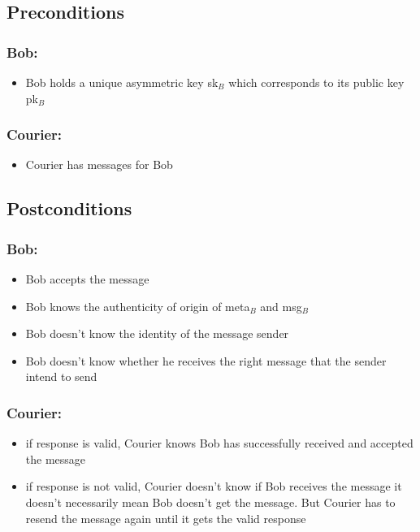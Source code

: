 \documentclass{article}
\begin{document}
\subsection*{Preconditions}
\subsubsection*{Bob:}
\begin{itemize}
\item Bob holds a unique asymmetric key sk$_B$ which corresponds to its public key pk$_B$
\end{itemize}

\subsubsection*{Courier:}
\begin{itemize}
\item Courier has messages for Bob
\end{itemize}

\subsection*{Postconditions}
\subsubsection*{Bob:}
\begin{itemize}
\item Bob accepts the message
\item Bob knows the authenticity of origin of meta$_B$ and msg$_B$
\item Bob doesn't know the identity of the message sender
\item Bob doesn't know whether he receives the right message that the sender intend to send
\end{itemize}

\subsubsection*{Courier:}
\begin{itemize}
\item if response is valid, Courier knows Bob has successfully received and accepted the message
\item if response is not valid, Courier doesn't know if Bob receives the message
\newline
it doesn't necessarily mean Bob doesn't get the message. But Courier has to resend the message again until it gets the valid response
\end{itemize}
\vspace{40pt}
\end{document}
